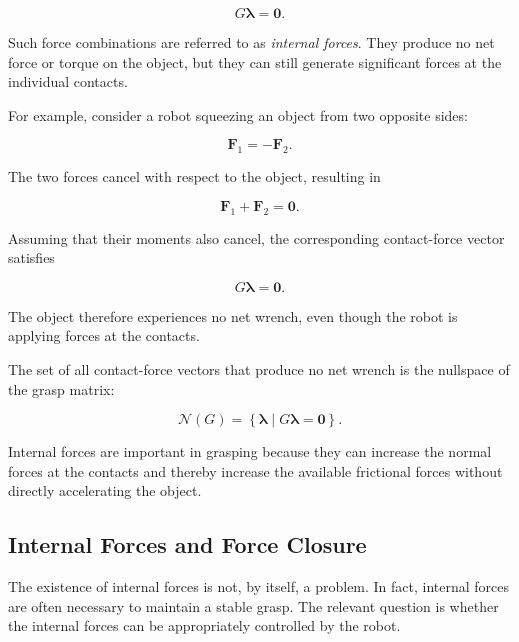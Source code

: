 \begin{equation}
G\boldsymbol{\lambda} = \mathbf{0}.
\end{equation}

Such force combinations are referred to as \textit{internal forces}. They produce no net force or torque on the object, but they can still generate significant forces at the individual contacts.

For example, consider a robot squeezing an object from two opposite sides:

\begin{equation}
\mathbf{F}_1 = -\mathbf{F}_2.
\end{equation}

The two forces cancel with respect to the object, resulting in

\begin{equation}
\mathbf{F}_1+\mathbf{F}_2 = \mathbf{0}.
\end{equation}

Assuming that their moments also cancel, the corresponding contact-force vector satisfies

\begin{equation}
G\boldsymbol{\lambda} = \mathbf{0}.
\end{equation}

The object therefore experiences no net wrench, even though the robot is applying forces at the contacts.

The set of all contact-force vectors that produce no net wrench is the nullspace of the grasp matrix:

\begin{equation}
\mathcal{N}(G)
= \left\{
\boldsymbol{\lambda}
\mid
G\boldsymbol{\lambda}=\mathbf{0}
\right\}.
\end{equation}

Internal forces are important in grasping because they can increase the normal forces at the contacts and thereby increase the available frictional forces without directly accelerating the object.

\subsection{Internal Forces and Force Closure}

The existence of internal forces is not, by itself, a problem. In fact, internal forces are often necessary to maintain a stable grasp. The relevant question is whether the internal forces can be appropriately controlled by the robot.

